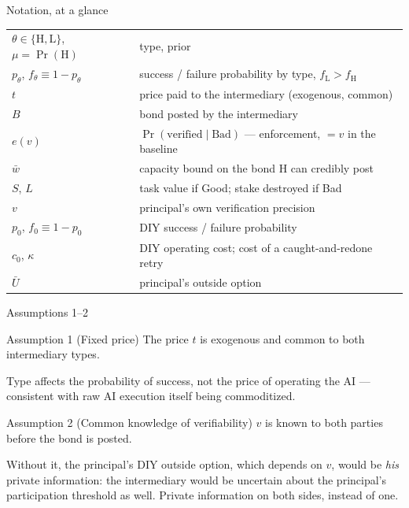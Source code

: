 \documentclass[11pt,aspectratio=169]{beamer}
\newcommand{\Ht}{\mathrm{H}}
\newcommand{\Lt}{\mathrm{L}}
\newcommand{\fH}{f_{\mathrm{H}}}
\newcommand{\fL}{f_{\mathrm{L}}}
\newcommand{\Ubar}{\bar U}
\newcommand{\wbar}{\bar w}
\begin{document}
\begin{frame}{Notation, at a glance}
\small
\begin{table}
\begin{tabular}{ll}
\toprule
$\theta\in\{\Ht,\Lt\}$, $\mu=\Pr(\Ht)$ & type, prior \\
$p_\theta$, $f_\theta\equiv1-p_\theta$ & success / failure probability by type, $\fL>\fH$ \\
$t$ & price paid to the intermediary (exogenous, common) \\
$B$ & bond posted by the intermediary \\
$e(v)$ & $\Pr(\text{verified}\mid\text{Bad})$ --- enforcement, $=v$ in the baseline \\
$\wbar$ & capacity bound on the bond $\Ht$ can credibly post \\
$S$, $L$ & task value if Good; stake destroyed if Bad \\
$v$ & principal's own verification precision \\
$p_0$, $f_0\equiv1-p_0$ & DIY success / failure probability \\
$c_0$, $\kappa$ & DIY operating cost; cost of a caught-and-redone retry \\
$\Ubar$ & principal's outside option \\
\bottomrule
\end{tabular}
\end{table}
\end{frame}

\begin{frame}{Assumptions 1--2}
\begin{exampleblock}{Assumption 1 (Fixed price)}
The price $t$ is exogenous and common to both intermediary types.
\end{exampleblock}
Type affects the probability of success, not the price of operating the AI --- consistent with raw AI execution itself being commoditized.
\vfill
\begin{exampleblock}{Assumption 2 (Common knowledge of verifiability)}
$v$ is known to both parties before the bond is posted.
\end{exampleblock}
Without it, the principal's DIY outside option, which depends on $v$, would be \emph{his} private information: the intermediary would be uncertain about the principal's participation threshold as well. Private information on both sides, instead of one.
\end{frame}
\end{document}
